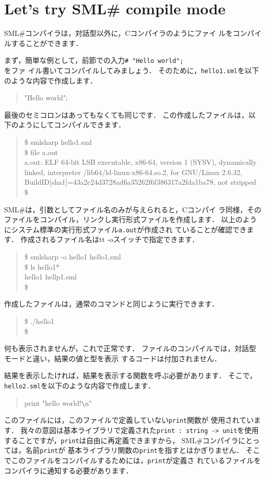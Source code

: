\documentclass{jbook}
\newcommand{\txt}[2]{#2}
\newcommand{\smlsharp}{SML\#}
\newenvironment{program}{\begin{quote}\begin{tt}}%
                        {\end{tt}\end{quote}}
\begin{document}
\fi%

\section{
\txt
{\smlsharp{}のコンパイルモードを試してみよう}
{Let's try \smlsharp{} compile mode}
}
\label{sec:tutorialCompile}

\ifjp%
	\smlsharp{}コンパイラは，対話型以外に，Cコンパイラのようにファイ
ルをコンパイルすることができます．

	まず，簡単な例として，前節での入力{\tt \# "Hello world";\\}をファ
イル書いてコンパイルしてみましょう．
	そのために，{\tt hello1.sml}を以下のような内容で作成します．
\begin{program}
"Hello world";
\end{program}
	最後のセミコロンはあってもなくても同じです．
	この作成したファイルは，以下のようにしてコンパイルできます．
\begin{program}
\$ smlsharp hello1.sml\\
\$ file a.out\\
a.out: ELF 64-bit LSB executable, x86-64,
version 1 (SYSV), dynamically linked,
interpreter /lib64/ld-linux-x86-64.so.2,
for GNU/Linux 2.6.32,
BuildID[sha1]=43a2c24d3728ad6a35262f6f386317a2fda1ba78,
not stripped\\
\$
\end{program}
	\smlsharp{}は，引数としてファイル名のみが与えられると，Cコンパイ
ラ同様，そのファイルをコンパイル，リンクし実行形式ファイルを作成します．
	以上のようにシステム標準の実行形式ファイル{\tt a.out}が作成され
ていることが確認できます．
	作成されるファイル名は{tt -o}スイッチで指定できます．
\begin{program}
\$ smlsharp -o hello1 hello1.sml\\
\$ ls hello1*\\
hello1   hellp1.sml\\
\$ 
\end{program}
	作成したファイルは，通常のコマンドと同じように実行できます．
\begin{program}
\$ ./hello1\\
\$ 
\end{program}
	何も表示されませんが，これで正常です．
	ファイルのコンパイルでは，対話型モードと違い，結果の値と型を表示
するコードは付加されません．

	結果を表示したければ，結果を表示する関数を呼ぶ必要があります．
	そこで，{\tt hello2.sml}を以下のような内容で作成します．
\begin{program}
print "hello world!\verb|\|n"
\end{program}
	このファイルには，このファイルで定義していない{\tt print}関数が
使用されています．
	我々の意図は基本ライブラリで定義された{\tt print :~string ->
unit}を使用することですが，{\tt print}は自由に再定義できますから，
\smlsharp{}コンパイラにとっては，名前{\tt print}が
基本ライブラリ関数の{\tt print}を指すとはかぎりません．
	そこでこのファイルをコンパイルするためには，{\tt print}が定義さ
れているファイルをコンパイラに通知する必要があります．
\end{document}
